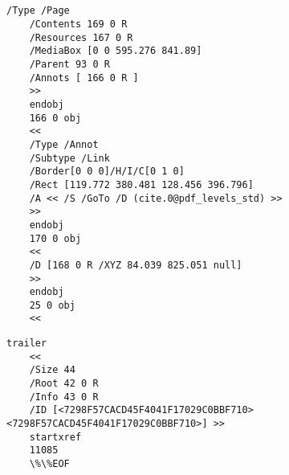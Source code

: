 \begin{appendices}
	\chapter{}
\begin{lstlisting}[label=lst:body,caption=Пример части тела PDF файла]
	/Type /Page
	/Contents 169 0 R
	/Resources 167 0 R
	/MediaBox [0 0 595.276 841.89]
	/Parent 93 0 R
	/Annots [ 166 0 R ]
	>>
	endobj
	166 0 obj
	<<
	/Type /Annot
	/Subtype /Link
	/Border[0 0 0]/H/I/C[0 1 0]
	/Rect [119.772 380.481 128.456 396.796]
	/A << /S /GoTo /D (cite.0@pdf_levels_std) >>
	>>
	endobj
	170 0 obj
	<<
	/D [168 0 R /XYZ 84.039 825.051 null]
	>>
	endobj
	25 0 obj
	<<
\end{lstlisting}



\begin{lstlisting}[label=lst:tail,caption=Пример <<хвоста>> PDF файла]
	trailer
	<< 
	/Size 44
	/Root 42 0 R
	/Info 43 0 R
	/ID [<7298F57CACD45F4041F17029C0BBF710> <7298F57CACD45F4041F17029C0BBF710>] >>
	startxref
	11085
	\%\%EOF
\end{lstlisting}
\end{appendices}